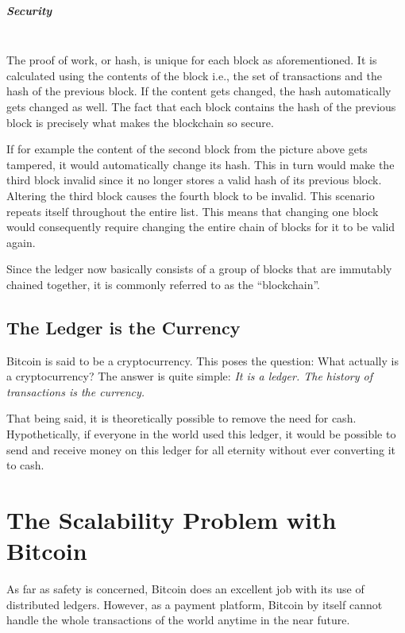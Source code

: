 \documentclass[a4paper, 12pt]{report}
\begin{document}
\paragraph{Security} \hspace{0pt} \\
The proof of work, or hash, is unique for each block as aforementioned. It is calculated using the contents of the block i.e., the set of transactions and the hash of the previous block. If the content gets changed, the hash automatically gets changed as well. The fact that each block contains the hash of the previous block is precisely what makes the blockchain so secure. 
\par If for example the content of the second block from the picture above gets tampered, it would automatically change its hash. This in turn would make the third block invalid since it no longer stores a valid hash of its previous block. Altering the third block causes the fourth block to be invalid. This scenario repeats itself throughout the entire list. This means that changing one block would consequently require changing the entire chain of blocks for it to be valid again. 
\par Since the ledger now basically consists of a group of blocks that are immutably chained together, it is commonly referred to as the “blockchain”. 

\section{The Ledger is the Currency}
\par Bitcoin is said to be a cryptocurrency. This poses the question: What actually is a cryptocurrency? The answer is quite simple: \textit{It is a ledger. The history of transactions is the currency.}
\par That being said, it is theoretically possible to remove the need for cash. Hypothetically, if everyone in the world used this ledger, it would be possible to send and receive money on this ledger for all eternity without ever converting it to cash.

\chapter{The Scalability Problem with Bitcoin}
\par As far as safety is concerned, Bitcoin does an excellent job with its use of distributed ledgers. However, as a payment platform, Bitcoin by itself cannot handle the whole transactions of the world anytime in the near future.
\end{document}
